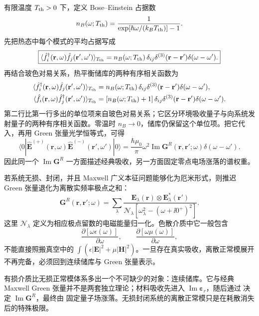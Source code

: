 有限温度 \(T_{\rm th}>0\) 下，定义 Bose--Einstein 占据数
\begin{equation*}
 n_B(\omega;T_{\rm th})
 =\frac1{\exp[\hbar\omega/(k_BT_{\rm th})]-1}.
\end{equation*}
先把热态中每个模式的平均占据写成
\begin{equation}
\boxed{
 \langle\hat f_i^\dagger(\mathbf r,\omega)
 \hat f_j(\mathbf r',\omega')\rangle_{T_{\rm th}}
 =n_B(\omega;T_{\rm th})\,
 \delta_{ij}\delta^{(3)}(\mathbf r-\mathbf r')\delta(\omega-\omega').}
\label{eq:reservoir-thermal-occupation-dp68}
\end{equation}
再结合玻色对易关系，热平衡储库的两种有序相关函数为
\begin{align}
 \langle\hat f_i^\dagger(\mathbf r,\omega)
 \hat f_j(\mathbf r',\omega')\rangle_{T_{\rm th}}
 &=n_B(\omega;T_{\rm th})\,
 \delta_{ij}\delta^{(3)}(\mathbf r-\mathbf r')\delta(\omega-\omega'),\notag\\
 \langle\hat f_i(\mathbf r,\omega)
 \hat f_j^\dagger(\mathbf r',\omega')\rangle_{T_{\rm th}}
 &=[n_B(\omega;T_{\rm th})+1]\,
 \delta_{ij}\delta^{(3)}(\mathbf r-\mathbf r')\delta(\omega-\omega').
 \label{eq:reservoir-thermal-correlators-dp43}
\end{align}
第二行比第一行多出的单位项来自玻色对易关系；它区分环境吸收量子与向系统发射量子的两种有序相关函数。零温时 \(n_B\to0\)，储库仍保留这个单位项。把它代入，再用 Green 张量光学恒等式，可得
\begin{equation}
\boxed{
 \langle0|\hat{\mathbf E}^{(+)}(\mathbf r,\omega)
 \hat{\mathbf E}^{(-)}(\mathbf r',\omega')|0\rangle
 =\frac{\hbar\mu_0}{\pi}\omega^2
 \operatorname{Im}\mathbf G^R(\mathbf r,\mathbf r';\omega)
 \delta(\omega-\omega').}
\label{eq:macqed-vacuum-field-correlation-dp68}
\end{equation}
因此同一个 \(\operatorname{Im}\mathbf G^R\) 一方面描述经典吸收，另一方面固定零点电场涨落的谱权重。



若系统无损、封闭，并且 Maxwell 广义本征问题能够化为厄米形式，则推迟 Green 张量退化为离散实频率极点之和：
\begin{equation}
 \mathbf G^R(\mathbf r,\mathbf r';\omega)
 =\sum_\lambda
 \frac{\mathbf E_\lambda(\mathbf r)\otimes\mathbf E_\lambda^*(\mathbf r')}
 {\mathcal N_\lambda[\omega_\lambda^2-(\omega+\ii0^+)^2]}.
 \label{eq:G-mode-expansion-SI-r12}
\end{equation}
这里 \(\mathcal N_\lambda\) 定义为相应极点留数的电磁能量归一化。色散介质中它一般包含
\begin{equation*}
 \frac{\partial[\omega\epsilon(\omega)]}{\partial\omega},
 \qquad
 \frac{\partial[\omega\mu(\omega)]}{\partial\omega},
\end{equation*}
不能直接照搬真空中的 \(\int(\epsilon|\mathbf E|^2+\mu|\mathbf H|^2)\)。一旦存在真实吸收，离散正常模展开不再完备，必须回到连续储库与 Green 张量表示。


有损介质比无损正常模体系多出一个不可缺少的对象：连续储库。它与经典 Maxwell Green 张量并不是两套独立理论；材料吸收先进入 \(\operatorname{Im}\boldsymbol\varepsilon_r\)，随后通过 决定 \(\operatorname{Im}\mathbf G^R\)，最终由 固定量子场涨落。无损封闭系统的离散正常模只是在耗散消失后的特殊极限。

